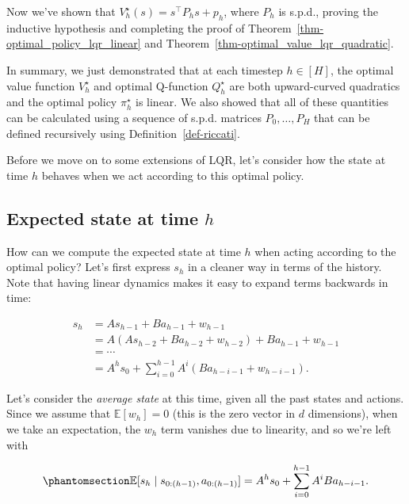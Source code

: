 \documentclass[
  letterpaper,
  DIV=11,
  numbers=noendperiod]{scrreprt}
\theoremstyle{plain}
\theoremstyle{plain}
\theoremstyle{definition}
\theoremstyle{definition}
\theoremstyle{remark}
\begin{document}
Now we've shown that \(V^\star_h(s) = s^\top P_hs+ p_h\), where \(P_h\)
is s.p.d., proving the inductive hypothesis and completing the proof of
Theorem~\ref{thm-optimal_policy_lqr_linear} and
Theorem~\ref{thm-optimal_value_lqr_quadratic}.

In summary, we just demonstrated that at each timestep \(h\in [H]\), the
optimal value function \(V^\star_h\) and optimal Q-function
\(Q^\star_h\) are both upward-curved quadratics and the optimal policy
\(\pi^\star_h\) is linear. We also showed that all of these quantities
can be calculated using a sequence of s.p.d. matrices
\(P_0, \dots, P_H\) that can be defined recursively using
Definition~\ref{def-riccati}.

Before we move on to some extensions of LQR, let's consider how the
state at time \(h\) behaves when we act according to this optimal
policy.

\subsection{\texorpdfstring{Expected state at time
\(h\)}{Expected state at time h}}\label{expected-state-at-time-h}

How can we compute the expected state at time \(h\) when acting
according to the optimal policy? Let's first express \(s_h\) in a
cleaner way in terms of the history. Note that having linear dynamics
makes it easy to expand terms backwards in time:

\[
\begin{aligned}
    s_h& = A s_{h-1} + B a_{h-1} + w_{h-1}                                 \\
            & = A (As_{h-2} + B a_{h-2} + w_{h-2}) + B a_{h-1} + w_{h-1} \\
            & = \cdots                                                                     \\
            & = A^hs_0 + \sum_{i=0}^{h-1} A^i (B a_{h-i-1} + w_{h-i-1}).
\end{aligned}
\]

Let's consider the \emph{average state} at this time, given all the past
states and actions. Since we assume that \(\mathbb{E}[w_h] = 0\) (this
is the zero vector in \(d\) dimensions), when we take an expectation,
the \(w_h\) term vanishes due to linearity, and so we're left with

\begin{equation}\phantomsection\label{eq-expected_state}{
\mathbb{E}[s_h\mid s_{0:(h-1)}, a_{0:(h-1)}] = A^hs_0 + \sum_{i=0}^{h-1} A^i B a_{h-i-1}.
}\end{equation}
\end{document}
